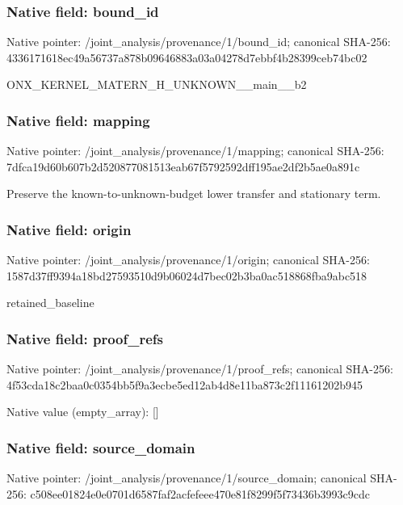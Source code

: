 \documentclass[10pt,a4paper]{article}
\begin{document}
\subsubsection{Native field: bound\_\allowbreak{}id}
Native pointer: /joint\_\allowbreak{}analysis/provenance/1/bound\_\allowbreak{}id; canonical SHA-256: 4336171618ec49a56737a878b09646883a03a04278d7ebbf4b28399ceb74bc02

\begingroup\raggedright\sloppy ONX\_\allowbreak{}KERNEL\_\allowbreak{}MATERN\_\allowbreak{}H\_\allowbreak{}UNKNOWN\_\allowbreak{}\_\allowbreak{}main\_\allowbreak{}\_\allowbreak{}b2\par\endgroup

\subsubsection{Native field: mapping}
Native pointer: /joint\_\allowbreak{}analysis/provenance/1/mapping; canonical SHA-256: 7dfca19d60b607b2d520877081513eab67f5792592dff195ae2df2b5ae0a891c

\begingroup\raggedright\sloppy Preserve the known-to-unknown-budget lower transfer and stationary term.\par\endgroup

\subsubsection{Native field: origin}
Native pointer: /joint\_\allowbreak{}analysis/provenance/1/origin; canonical SHA-256: 1587d37ff9394a18bd27593510d9b06024d7bec02b3ba0ac518868fba9abc518

\begingroup\raggedright\sloppy retained\_\allowbreak{}baseline\par\endgroup

\subsubsection{Native field: proof\_\allowbreak{}refs}
Native pointer: /joint\_\allowbreak{}analysis/provenance/1/proof\_\allowbreak{}refs; canonical SHA-256: 4f53cda18c2baa0c0354bb5f9a3ecbe5ed12ab4d8e11ba873c2f11161202b945

Native value (empty\_\allowbreak{}array): []

\subsubsection{Native field: source\_\allowbreak{}domain}
Native pointer: /joint\_\allowbreak{}analysis/provenance/1/source\_\allowbreak{}domain; canonical SHA-256: c508ee01824e0e0701d6587faf2acfefeee470e81f8299f5f73436b3993c9cdc
\end{document}
